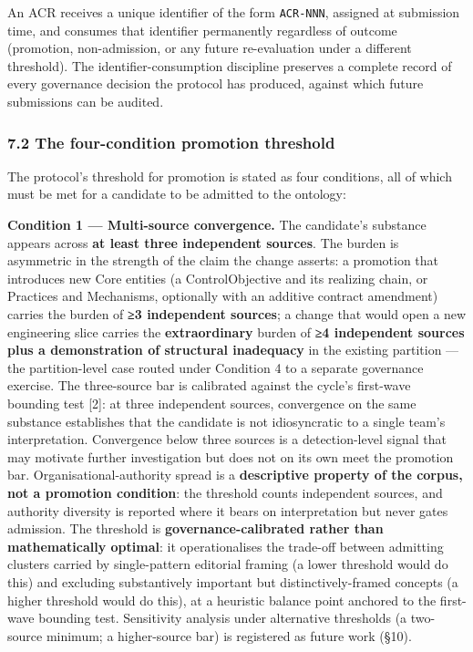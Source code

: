 \documentclass[
]{article}
\begin{document}
An ACR receives a unique identifier of the form \texttt{ACR-NNN},
assigned at submission time, and consumes that identifier permanently
regardless of outcome (promotion, non-admission, or any future
re-evaluation under a different threshold). The identifier-consumption
discipline preserves a complete record of every governance decision the
protocol has produced, against which future submissions can be audited.

\subsubsection{7.2 The four-condition promotion
threshold}\label{the-four-condition-promotion-threshold}

The protocol's threshold for promotion is stated as four conditions, all
of which must be met for a candidate to be admitted to the ontology:

\textbf{Condition 1 --- Multi-source convergence.} The candidate's
substance appears across \textbf{at least three independent sources}.
The burden is asymmetric in the strength of the claim the change
asserts: a promotion that introduces new Core entities (a
ControlObjective and its realizing chain, or Practices and Mechanisms,
optionally with an additive contract amendment) carries the burden of
\textbf{≥3 independent sources}; a change that would open a new
engineering slice carries the \textbf{extraordinary} burden of
\textbf{≥4 independent sources plus a demonstration of structural
inadequacy} in the existing partition --- the partition-level case
routed under Condition 4 to a separate governance exercise. The
three-source bar is calibrated against the cycle's first-wave bounding
test {[}2{]}: at three independent sources, convergence on the same
substance establishes that the candidate is not idiosyncratic to a
single team's interpretation. Convergence below three sources is a
detection-level signal that may motivate further investigation but does
not on its own meet the promotion bar. Organisational-authority spread
is a \textbf{descriptive property of the corpus, not a promotion
condition}: the threshold counts independent sources, and authority
diversity is reported where it bears on interpretation but never gates
admission. The threshold is \textbf{governance-calibrated rather than
mathematically optimal}: it operationalises the trade-off between
admitting clusters carried by single-pattern editorial framing (a lower
threshold would do this) and excluding substantively important but
distinctively-framed concepts (a higher threshold would do this), at a
heuristic balance point anchored to the first-wave bounding test.
Sensitivity analysis under alternative thresholds (a two-source minimum;
a higher-source bar) is registered as future work (§10).
\end{document}
